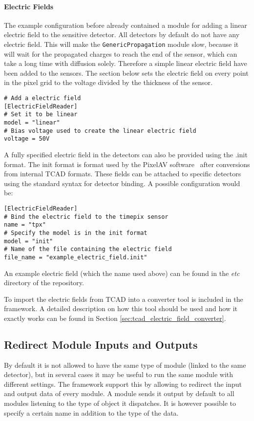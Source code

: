 \paragraph{Electric Fields}
\label{sec:module_electric_field}
The example configuration before already contained a module for adding a linear electric field to the sensitive detector. All detectors by default do not have any electric field. This will make the \texttt{GenericPropagation} module slow, because it will wait for the propagated charges to reach the end of the sensor, which can take a long time with diffusion solely. Therefore a simple linear electric field have been added to the sensors. The section below sets the electric field on every point in the pixel grid to the voltage divided by the thickness of the sensor.
\begin{verbatim}
# Add a electric field
[ElectricFieldReader]
# Set it to be linear
model = "linear"
# Bias voltage used to create the linear electric field
voltage = 50V
\end{verbatim}


A fully specified electric field in the detectors can also be provided using the .init format. The init format is format used by the PixelAV software~\cite{swartz2002detailed,swartz2003cms} after conversions from internal TCAD formats. These fields can be attached to specific detectors using the standard syntax for detector binding. A possible configuration would be:
\begin{verbatim}
[ElectricFieldReader]
# Bind the electric field to the timepix sensor
name = "tpx"
# Specify the model is in the init format
model = "init"
# Name of the file containing the electric field
file_name = "example_electric_field.init"
\end{verbatim}
An example electric field (which the name used above) can be found in the \textit{etc} directory of the \apsq repository. 

To import the electric fields from TCAD into \apsq a converter tool is included in the framework. A detailed description on how this tool should be used and how it exactly works can be found in Section \ref{sec:tcad_electric_field_converter}.

\subsection{Redirect Module Inputs and Outputs}
\label{sec:redirect_module_input_outputs}
By default it is not allowed to have the same type of module (linked to the same detector), but in several cases it may be useful to run the same module with different settings. The \apsq framework support this by allowing to redirect the input and output data of every module. A module sends it output by default to all modules listening to the type of object it dispatches. It is however possible to specify a certain name in addition to the type of the data.

